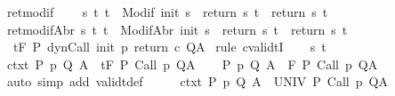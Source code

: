 \begin{isabellebody}
\ ret{\isacharunderscore}modif{\isacharcolon}\isanewline
\ \ \ \ {\isachardoublequoteopen}{\isasymforall}s\ t{\isachardot}\ t\ {\isasymin}\ Modif\ {\isacharparenleft}init\ s{\isacharparenright}\ {\isasymlongrightarrow}\ return{\isacharprime}\ s\ t\ {\isacharequal}\ return\ s\ t{\isachardoublequoteclose}\isanewline
{}\ ret{\isacharunderscore}modifAbr{\isacharcolon}\ {\isachardoublequoteopen}{\isasymforall}s\ t{\isachardot}\ t\ {\isasymin}\ ModifAbr\ {\isacharparenleft}init\ s{\isacharparenright}\ {\isasymlongrightarrow}\ return{\isacharprime}\ s\ t\ {\isacharequal}\ return\ s\ t{\isachardoublequoteclose}\isanewline
{}\ {\isachardoublequoteopen}{\isasymGamma}{\isacharcomma}{\isasymTheta}\ {\isasymTurnstile}\isactrlsub t\isactrlbsub {\isacharslash}F\isactrlesub \ P\ {\isacharparenleft}dynCall\ init\ p\ return\ c{\isacharparenright}\ Q{\isacharcomma}A{\isachardoublequoteclose}\isanewline
%
\isadelimproof
%
\endisadelimproof
%
\isatagproof
{}\isamarkupfalse%
\ {\isacharparenleft}rule\ cvalidtI{\isacharparenright}\isanewline
\ \ \isamarkupfalse%
\ s\ t\isanewline
\ \ \isamarkupfalse%
\ ctxt{\isacharcolon}\ {\isachardoublequoteopen}{\isasymforall}{\isacharparenleft}P{\isacharcomma}\ p{\isacharcomma}\ Q{\isacharcomma}\ A{\isacharparenright}{\isasymin}{\isasymTheta}{\isachardot}\ {\isasymGamma}\ {\isasymTurnstile}\isactrlsub t\isactrlbsub {\isacharslash}F\isactrlesub \ P\ {\isacharparenleft}Call\ p{\isacharparenright}\ Q{\isacharcomma}A{\isachardoublequoteclose}\isanewline
\ \ \isamarkupfalse%
\ {\isachardoublequoteopen}{\isasymforall}{\isacharparenleft}P{\isacharcomma}\ p{\isacharcomma}\ Q{\isacharcomma}\ A{\isacharparenright}{\isasymin}{\isasymTheta}{\isachardot}\ {\isasymGamma}\ {\isasymTurnstile}\isactrlbsub {\isacharslash}F\isactrlesub \ P\ {\isacharparenleft}Call\ p{\isacharparenright}\ Q{\isacharcomma}A{\isachardoublequoteclose}\ \isanewline
\ \ \ \ \isamarkupfalse%
\ {\isacharparenleft}auto\ simp\ add{\isacharcolon}\ validt{\isacharunderscore}def{\isacharparenright}\isanewline
\ \ \isamarkupfalse%
\ \isamarkupfalse%
\ ctxt{\isacharprime}{\isacharcolon}\ {\isachardoublequoteopen}{\isasymforall}{\isacharparenleft}P{\isacharcomma}\ p{\isacharcomma}\ Q{\isacharcomma}\ A{\isacharparenright}{\isasymin}{\isasymTheta}{\isachardot}\ {\isasymGamma}\ {\isasymTurnstile}\isactrlbsub {\isacharslash}UNIV\isactrlesub \ P\ {\isacharparenleft}Call\ p{\isacharparenright}\ Q{\isacharcomma}A{\isachardoublequoteclose}\isanewline

\end{isabellebody}

